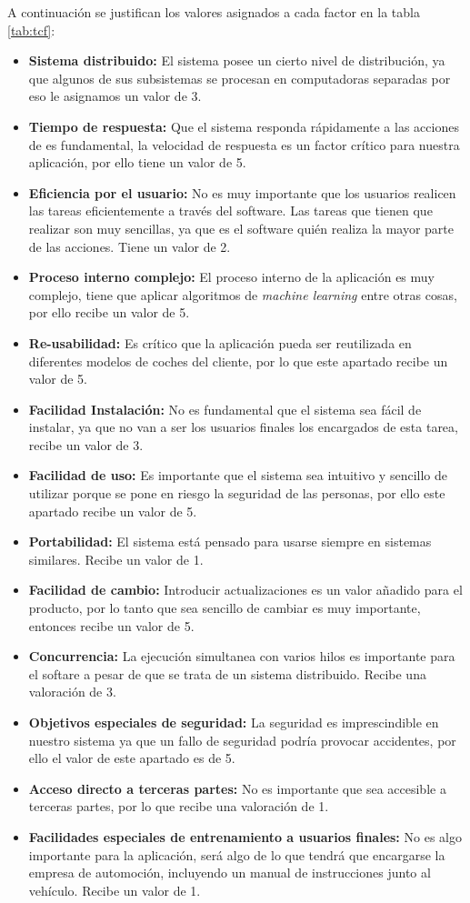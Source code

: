\bigskip
\par A continuación se justifican los valores asignados a cada factor en la tabla \ref{tab:tcf}:
\begin{itemize}[-]
  \item \textbf{Sistema distribuido:} El sistema posee un cierto nivel de distribución, ya que algunos de sus subsistemas se procesan en computadoras separadas por eso le asignamos un valor de 3.
  \item \textbf{Tiempo de respuesta:} Que el sistema responda rápidamente a las acciones de es fundamental, la velocidad de respuesta es un factor crítico para nuestra aplicación, por ello tiene un valor de 5.
  \item \textbf{Eficiencia por el usuario:} No es muy importante que los usuarios realicen las tareas eficientemente a través del software. Las tareas que tienen que realizar son muy sencillas, ya que es el software quién realiza la mayor parte de las acciones. Tiene un valor de 2.
  \item \textbf{Proceso interno complejo:} El proceso interno de la aplicación es muy complejo, tiene que aplicar algoritmos de \textit{machine learning} entre otras cosas, por ello recibe un valor de 5.
  \item \textbf{Re-usabilidad:} Es crítico que la aplicación pueda ser reutilizada en diferentes modelos de coches del cliente, por lo que este apartado recibe un valor de 5.
  \item \textbf{Facilidad Instalación:} No es fundamental que el sistema sea fácil de instalar, ya que no van a ser los usuarios finales los encargados de esta tarea, recibe un valor de 3.
  \item \textbf{Facilidad de uso:} Es importante que el sistema sea intuitivo y sencillo de utilizar porque se pone en riesgo la seguridad de las personas, por ello este apartado recibe un valor de 5.
  \item \textbf{Portabilidad:} El sistema está pensado para usarse siempre en sistemas similares. Recibe un valor de 1.
  \item \textbf{Facilidad de cambio:} Introducir actualizaciones es un valor añadido para el producto, por lo tanto que sea sencillo de cambiar es muy importante, entonces recibe un valor de 5.
  \item \textbf{Concurrencia:} La ejecución simultanea con varios hilos es importante para el softare a pesar de que se trata de un sistema distribuido. Recibe una valoración de 3.
  \item \textbf{Objetivos especiales de seguridad:} La seguridad es imprescindible en nuestro sistema ya que un fallo de seguridad podría provocar accidentes, por ello el valor de este apartado es de 5.
  \item \textbf{Acceso directo a terceras partes:} No es importante que sea accesible a terceras partes, por lo que recibe una valoración de 1.
  \item \textbf{Facilidades especiales de entrenamiento a usuarios finales:} No es algo importante para la aplicación, será algo de lo que tendrá que encargarse la empresa de automoción, incluyendo un manual de instrucciones junto al vehículo. Recibe un valor de 1.
\end{itemize}

